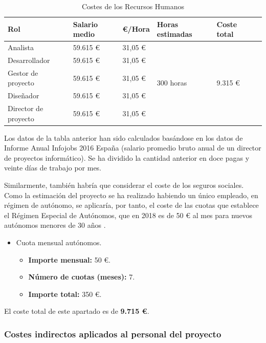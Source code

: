 \documentclass[twoside]{report}
\begin{document}
\begin{table}[H]
\center
\begin{tabular}{|l|l|l|l|l|l|}
\hline
Rol                & Salario medio & \euro/Hora   & Horas estimadas & Coste total \\ \hline
Analista           & 59.615 \euro      & 31,05 \euro & \multirow{5}{*}{300 horas} & \multirow{5}{*}{9.315 \euro} \\\cline{1-3}
Desarrollador      & 59.615 \euro      & 31,05 \euro  & & \\\cline{1-3}
Gestor de proyecto & 59.615 \euro      & 31,05 \euro & & \\ \cline{1-3}
Diseñador          & 59.615 \euro      & 31,05 \euro & & \\ \cline{1-3}
Director de proyecto & 59.615 \euro    & 31,05 \euro & & \\ \cline{1-3}
\hline
\end{tabular}
\caption{Costes de los Recursos Humanos}
\end{table}

Los datos de la tabla anterior han sido calculados basándose en los datos de \cite{infojobs2016} Informe Anual Infojobs 2016 España (salario promedio bruto anual de un director de proyectos informático). Se ha dividido la cantidad anterior en doce pagas y veinte días de trabajo por mes.

Similarmente, también habría que considerar el coste de los seguros sociales. Como la estimación del proyecto se ha realizado  habiendo un único empleado, en régimen de autónomo, se aplicaría, por tanto, el coste de las cuotas que establece el Régimen Especial de Autónomos, que en 2018 es de 50 \euro \vspace{0.1cm} al mes para nuevos autónomos menores de 30 años \cite{segsocialautonomos}.

\begin{itemize}
\item Cuota mensual autónomos.
	\begin{itemize}
	\item \textbf{Importe mensual:} 50 \euro.
	\item \textbf{Número de cuotas (meses): } 7.
	\item \textbf{Importe total: } 350 \euro.
	\end{itemize}
\end{itemize}

El coste total de este apartado es de \textbf{9.715 \euro}.

\subsubsection{Costes indirectos aplicados al personal del proyecto}
\end{document}
